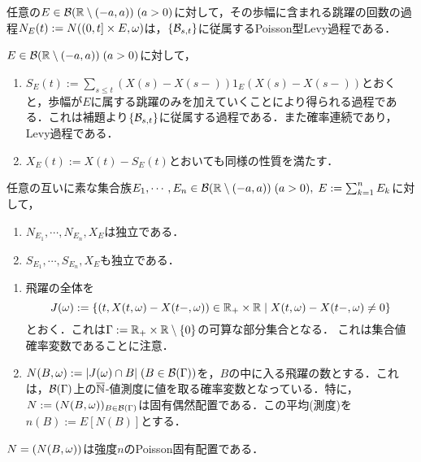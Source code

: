 \documentclass[uplatex,dvipdfmx]{jsreport}
\begin{document}
\begin{lemma}
    任意の$E\in\mathcal{B}(\mathbb{R}\setminus(-a,a))\;(a>0)$に対して，その歩幅に含まれる跳躍の回数の過程$N_E(t):=N((0,t]\times E,\omega)$は，$\{\mathcal{B}_{s,t}\}$に従属するPoisson型Levy過程である．
\end{lemma}

\begin{notation}
    $E\in\mathcal{B}(\mathbb{R}\setminus(-a,a))\;(a>0)$に対して，
    \begin{enumerate}
        \item $S_E(t):=\sum_{s\le t}(X(s)-X(s-))1_E(X(s)-X(s-))$とおくと，歩幅が$E$に属する跳躍のみを加えていくことにより得られる過程である．これは補題より$\{\mathcal{B}_{s,t}\}$に従属する過程である．また確率連続であり，Levy過程である．
        \item $X_E(t):=X(t)-S_E(t)$とおいても同様の性質を満たす．
    \end{enumerate}
\end{notation}

\begin{lemma}
    任意の互いに素な集合族$E_1,\cdots,E_n\in\mathcal{B}(\mathbb{R}\setminus(-a,a))\;(a>0),\;E:=\sum_{k=1}^nE_k$に対して，
    \begin{enumerate}
        \item $N_{E_1},\cdots,N_{E_n},X_E$は独立である．
        \item $S_{E_1},\cdots,S_{E_n},X_E$も独立である．
    \end{enumerate}
\end{lemma}

\begin{notation}\mbox{}
    \begin{enumerate}
        \item 飛躍の全体を
        \[J(\omega):=\left\{(t,X(t,\omega)-X(t-,\omega))\in\mathbb{R}_+\times\mathbb{R}\mid X(t,\omega)-X(t-,\omega)\ne0\right\}\]
        とおく．これは$\Gamma:=\mathbb{R}_+\times\mathbb{R}\setminus\{0\}$の可算な部分集合となる．
        これは集合値確率変数であることに注意．
        \item $N(B,\omega):=\lvert J(\omega)\cap B\rvert\;(B\in\mathcal{B}(\Gamma))$を，$B$の中に入る飛躍の数とする．これは，$\mathcal{B}(\Gamma)$上の$\overline{\mathbb{N}}$-値測度に値を取る確率変数となっている．特に，$N:=(N(B,\omega))_{B\in\mathcal{B}(\Gamma)}$は固有偶然配置である．この平均(測度)を$n(B):=E[N(B)]$とする．
    \end{enumerate}
\end{notation}

\begin{lemma}
    $N=(N(B,\omega))$は強度$n$のPoisson固有配置である．
\end{lemma}
\end{document}
